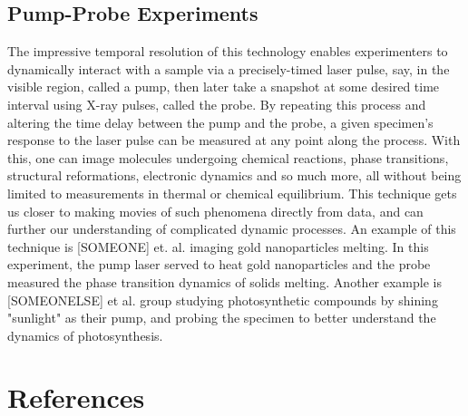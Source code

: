 \documentclass[aps,prb,twocolumn,superscriptaddress]{revtex4-2}
\begin{document}
\subsection{Pump-Probe Experiments}\label{sec:pump-probe}
The impressive temporal resolution of this technology enables experimenters to 
dynamically interact with a sample via a precisely-timed laser pulse, say, in
the visible region, called a pump, then later take a snapshot at some desired
time interval using X-ray pulses, called the probe. By repeating this process
and altering the time delay between the pump and the probe, a given specimen's
response to the laser pulse can be measured at any point along the process.
With this, one can image molecules undergoing chemical reactions, phase
transitions, structural reformations, electronic dynamics and so much more, all
without being limited to measurements in thermal or chemical equilibrium.
This technique gets us closer to making movies of such phenomena directly from
data, and can further our understanding of complicated dynamic processes. An 
example of this technique is [SOMEONE] et. al. imaging gold nanoparticles 
melting. In this experiment, the pump laser served to heat gold nanoparticles
and the probe measured the phase transition dynamics of solids melting. Another 
example is [SOMEONELSE] et al. group studying photosynthetic compounds by
shining "sunlight" as their pump, and probing the specimen to better understand
the dynamics of photosynthesis.

\newpage
\section{References}


\end{document}
